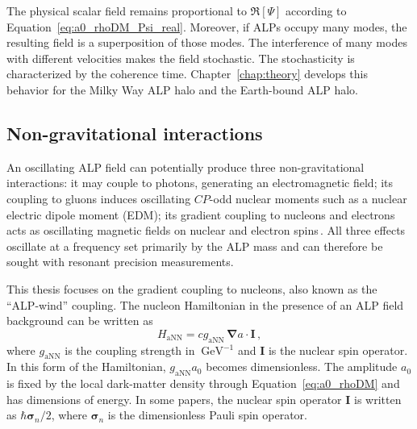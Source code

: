 The physical scalar field remains proportional to $\Re[\Psi]$ according to Equation~\eqref{eq:a0_rhoDM_Psi_real}.
Moreover, if ALPs occupy many modes, the resulting field is a superposition of those modes.
The interference of many modes with different velocities makes the field stochastic.
The stochasticity is characterized by the coherence time.
Chapter~\ref{chap:theory} develops this behavior for the Milky Way ALP halo and the Earth-bound ALP halo.

\subsection{Non-gravitational interactions}
An oscillating ALP field can potentially produce three non-gravitational interactions: it may couple to photons, generating an electromagnetic field; its coupling to gluons induces oscillating $CP$-odd nuclear moments such as a nuclear electric dipole moment (EDM); its gradient coupling to nucleons and electrons acts as oscillating magnetic fields on nuclear and electron spins\,\cite{GrahamNewobservables}.
All three effects oscillate at a frequency set primarily by the ALP mass and can therefore be sought with resonant precision measurements.

This thesis focuses on the gradient coupling to nucleons, also known as the ``ALP-wind'' coupling.
The nucleon Hamiltonian in the presence of an ALP field background can be written as
\begin{equation}
    H_{\mathrm{aNN}} = c g_{\mathrm{aNN}}\,{\boldsymbol\nabla}a\cdot\boldsymbol{I}
    \,,\label{eq:HaNN}
\end{equation}
where $g_{\mathrm{aNN}}$ is the coupling strength in $\SI{}{\GeV^{-1}}$ and $\boldsymbol{I}$ is the nuclear spin operator.
In this form of the Hamiltonian, $g_{\mathrm{aNN}} a_0$ becomes dimensionless.
The amplitude $a_0$ is fixed by the local dark-matter density through Equation~\eqref{eq:a0_rhoDM} and has dimensions of energy.
In some papers, the nuclear spin operator $\boldsymbol{I}$ is written as $\hbar {\boldsymbol\sigma_n}/2$, where ${\boldsymbol\sigma_n}$ is the dimensionless Pauli spin operator.


